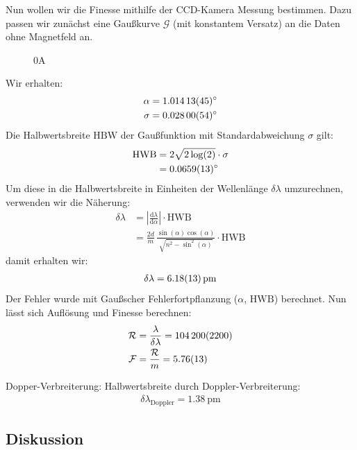 \documentclass[11pt, a4paper]{article}
\begin{document}
Nun wollen wir die Finesse mithilfe der CCD-Kamera Messung bestimmen.
Dazu passen wir zunächst eine Gaußkurve $\mathcal{G}$ (mit konstantem Versatz) an die Daten ohne Magnetfeld an.
\begin{figure}[h]
	\centering
	
	\caption{0A}
	\label{fig:gauss0}
\end{figure}
Wir erhalten:
\begin{align}
	\alpha &= \SI{1.01413 +- 0.00045}{\degree}\\
	\sigma &= \SI{0.02800 +- 0.00054}{\degree}
\end{align}
Die Halbwertsbreite $\mathrm{HBW}$ der Gaußfunktion mit Standardabweichung $\sigma$ gilt:
\begin{align}
\mathrm{HWB} &= 2 \sqrt{2\log(2)} \cdot \sigma\\
 &= \SI{0.0659 +- 0.0013}{\degree}
\end{align}
Um diese in die Halbwertsbreite in Einheiten der Wellenlänge $\delta \lambda$ umzurechnen, verwenden wir die Näherung:
\begin{align}
	\delta \lambda &= \left| \frac{\mathrm{d}\lambda}{\mathrm{d}\alpha} \right| \cdot \mathrm{HWB} \\
	 &= \frac{2d}{m} \, \frac{\sin(\alpha) \cos(\alpha)}{\sqrt{n^2-\sin^2(\alpha)}} \cdot \mathrm{HWB}
\end{align}
damit erhalten wir:
\begin{align}
	\delta \lambda = \SI{6.18 +- 0.13}{\pico\metre}
\end{align}
Der Fehler wurde mit Gaußscher Fehlerfortpflanzung ($\alpha$, $\mathrm{HWB}$) berechnet.
Nun lässt sich Auflösung und Finesse berechnen:
\begin{align}
	\mathcal{R} &= \frac{\lambda}{\delta \lambda} = \num{104200 +- 2200} \\
	\mathcal{F} &= \frac{\mathcal{R}}{m} = \num{5.76 +- 0.13}
\end{align}

Dopper-Verbreiterung: Halbwertsbreite durch Doppler-Verbreiterung:
\begin{align}
	\delta \lambda_\mathrm{Doppler} = \SI{1.38}{\pico\metre}
\end{align}


\subsection{Diskussion}

\FloatBarrier
\end{document}
